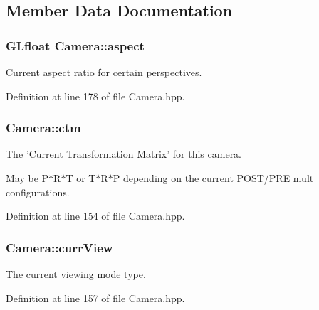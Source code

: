 \subsection{Member Data Documentation}
\hypertarget{class_camera_af3fdbc52ba0f7af7d8091986d6303119}{
\subsubsection[{aspect}]{\setlength{\rightskip}{0pt plus 5cm}G\-Lfloat Camera\-::aspect\hspace{0.3cm}{\ttfamily [private]}}}\label{class_camera_af3fdbc52ba0f7af7d8091986d6303119}


Current aspect ratio for certain perspectives. 



Definition at line 178 of file Camera.\-hpp.

\hypertarget{class_camera_a9b1e81e3f5531390bb6a599dca0d2444}{
\subsubsection[{ctm}]{ Camera\-::ctm\hspace{0.3cm}{\ttfamily [private]}}}\label{class_camera_a9b1e81e3f5531390bb6a599dca0d2444}


The 'Current Transformation Matrix' for this camera. 

May be P$\ast$\-R$\ast$\-T or T$\ast$\-R$\ast$\-P depending on the current P\-O\-S\-T/\-P\-R\-E mult configurations. 

Definition at line 154 of file Camera.\-hpp.

\hypertarget{class_camera_a1fe2ef68d26bb98f0aa736948304eb64}{
\subsubsection[{curr\-View}]{ Camera\-::curr\-View\hspace{0.3cm}{\ttfamily [private]}}}\label{class_camera_a1fe2ef68d26bb98f0aa736948304eb64}


The current viewing mode type. 



Definition at line 157 of file Camera.\-hpp.

